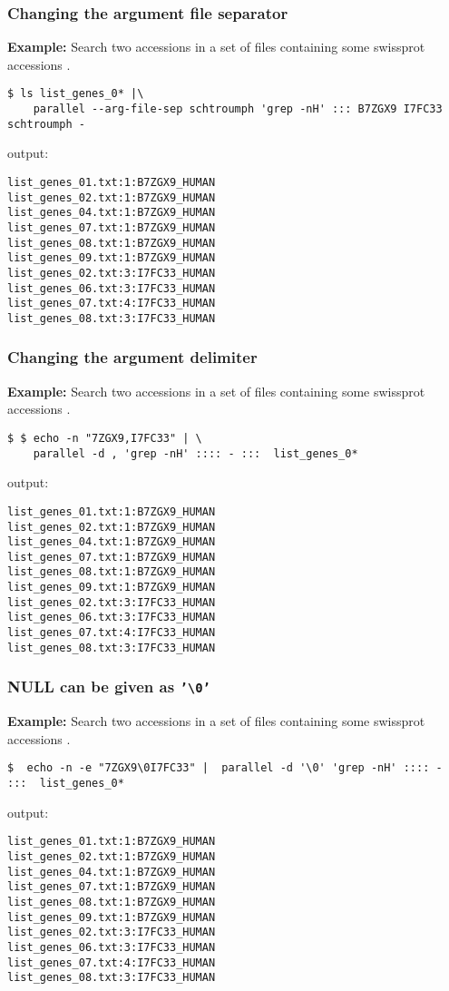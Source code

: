 \documentclass{article}
\newcommand{\example}[1]{
\textbf{Example: } {\color[rgb]{0,0,1} #1 } .
}
\newcommand{\cmdoption}[1]{\texttt{'#1'}}
\begin{document}
\subsubsection{Changing the argument file separator}
\example{Search two accessions in a set of files containing some  swissprot accessions }
\begin{lstlisting}
$ ls list_genes_0* |\
	parallel --arg-file-sep schtroumph 'grep -nH' ::: B7ZGX9 I7FC33 schtroumph -
\end{lstlisting}
output:
\begin{lstlisting}
list_genes_01.txt:1:B7ZGX9_HUMAN
list_genes_02.txt:1:B7ZGX9_HUMAN
list_genes_04.txt:1:B7ZGX9_HUMAN
list_genes_07.txt:1:B7ZGX9_HUMAN
list_genes_08.txt:1:B7ZGX9_HUMAN
list_genes_09.txt:1:B7ZGX9_HUMAN
list_genes_02.txt:3:I7FC33_HUMAN
list_genes_06.txt:3:I7FC33_HUMAN
list_genes_07.txt:4:I7FC33_HUMAN
list_genes_08.txt:3:I7FC33_HUMAN
\end{lstlisting}
\subsubsection{Changing the argument delimiter}
\example{Search two accessions in a set of files containing some  swissprot accessions }
\begin{lstlisting}
$ $ echo -n "7ZGX9,I7FC33" | \
	parallel -d , 'grep -nH' :::: - :::  list_genes_0*
\end{lstlisting}
output:
\begin{lstlisting}
list_genes_01.txt:1:B7ZGX9_HUMAN
list_genes_02.txt:1:B7ZGX9_HUMAN
list_genes_04.txt:1:B7ZGX9_HUMAN
list_genes_07.txt:1:B7ZGX9_HUMAN
list_genes_08.txt:1:B7ZGX9_HUMAN
list_genes_09.txt:1:B7ZGX9_HUMAN
list_genes_02.txt:3:I7FC33_HUMAN
list_genes_06.txt:3:I7FC33_HUMAN
list_genes_07.txt:4:I7FC33_HUMAN
list_genes_08.txt:3:I7FC33_HUMAN
\end{lstlisting}

\subsubsection{NULL can be given as  \cmdoption{\textbackslash{}0}}
\example{Search two accessions in a set of files containing some swissprot accessions }
\begin{lstlisting}
$  echo -n -e "7ZGX9\0I7FC33" |  parallel -d '\0' 'grep -nH' :::: - :::  list_genes_0*
\end{lstlisting}
output:
\begin{lstlisting}
list_genes_01.txt:1:B7ZGX9_HUMAN
list_genes_02.txt:1:B7ZGX9_HUMAN
list_genes_04.txt:1:B7ZGX9_HUMAN
list_genes_07.txt:1:B7ZGX9_HUMAN
list_genes_08.txt:1:B7ZGX9_HUMAN
list_genes_09.txt:1:B7ZGX9_HUMAN
list_genes_02.txt:3:I7FC33_HUMAN
list_genes_06.txt:3:I7FC33_HUMAN
list_genes_07.txt:4:I7FC33_HUMAN
list_genes_08.txt:3:I7FC33_HUMAN
\end{lstlisting}
\end{document}
